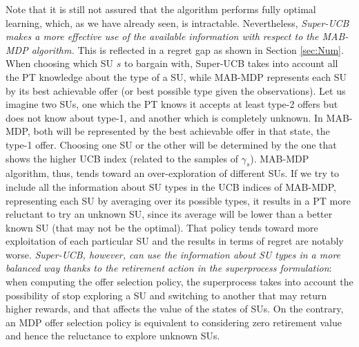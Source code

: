 Note that it is still not assured that the algorithm performs fully optimal learning, which, as we have already seen, is intractable.
Nevertheless, \textit{Super-UCB makes a more effective use of the available information with respect to the MAB-MDP algorithm.} This is reflected in a regret gap as shown in Section \ref{sec:Num}. 
When choosing which SU $s$ to bargain with, Super-UCB takes into account all the PT knowledge about the type of a SU, while MAB-MDP represents each SU by its best achievable offer (or best possible type given the observations). 
Let us imagine two SUs, one which the PT knows it accepts at least type-2 offers but does not know about type-1, and another which is completely unknown. 
In MAB-MDP, both will be represented by the best achievable offer in that state, the type-1 offer. Choosing one SU or the other will be determined by the one that shows the higher UCB index (related to the samples of $\gamma_s$).
MAB-MDP algorithm, thus, tends toward an over-exploration of different SUs.
If we try to include all the information about SU types in the UCB indices of MAB-MDP, representing each SU by averaging over its possible types, it results in a PT more reluctant to try an unknown SU, since its average will be lower than a better known SU (that may not be the optimal). That policy tends toward more exploitation of each particular SU and the results in terms of regret are notably worse. \textit{Super-UCB, however, can use the information about SU types in a more balanced way thanks to the retirement action in the superprocess formulation}: when computing the offer selection policy, the superprocess takes into account the possibility of stop exploring a SU and switching to another that may return higher rewards, and that affects the value of the states of SUs. On the contrary, an MDP offer selection policy is equivalent to considering zero retirement value and hence the reluctance to explore unknown SUs.  

